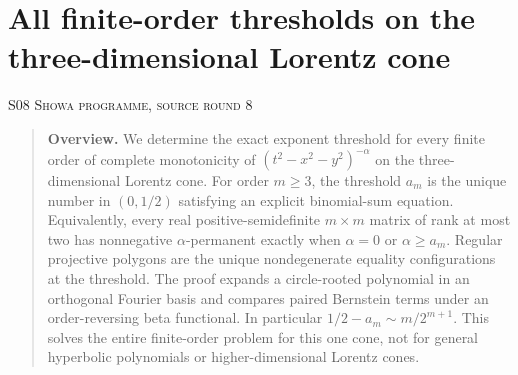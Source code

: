 \documentclass[11pt,a4paper]{article}
\theoremstyle{definition}\newtheorem{definition}[theorem]{Definition}
\theoremstyle{remark}\newtheorem{remark}[theorem]{Remark}
\numberwithin{equation}{section}
\begin{document}
\clearpage
\section[S08 --- All finite-order thresholds on the three-dimensional Lorentz cone]{All finite-order thresholds on the three-dimensional Lorentz cone}\label{contrib-S08}
\noindent\textsc{S08 \quad Showa programme, source round 8}\par\medskip


\begin{quote}\small\textbf{Overview.} We determine the exact exponent threshold for every finite order of complete monotonicity of $(t^2-x^2-y^2)^{-\alpha}$ on the three-dimensional Lorentz cone. For order $m\ge3$, the threshold $a_m$ is the unique number in $(0,1/2)$ satisfying an explicit binomial-sum equation. Equivalently, every real positive-semidefinite $m\times m$ matrix of rank at most two has nonnegative $\alpha$-permanent exactly when $\alpha=0$ or $\alpha\ge a_m$. Regular projective polygons are the unique nondegenerate equality configurations at the threshold. The proof expands a circle-rooted polynomial in an orthogonal Fourier basis and compares paired Bernstein terms under an order-reversing beta functional. In particular $1/2-a_m\sim m/2^{m+1}$. This solves the entire finite-order problem for this one cone, not for general hyperbolic polynomials or higher-dimensional Lorentz cones.\end{quote}
\end{document}
